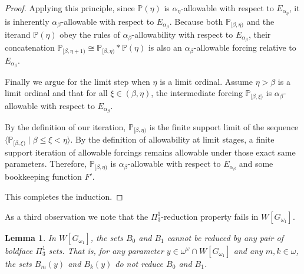 \documentclass[a4paper,11pt]{article}
\newtheorem{lemma}[theorem]{Lemma}
\begin{document}
\begin{proof}
Applying this principle, since $\mathbb{P}(\eta)$ is $\alpha_{\eta}$-allowable with respect to $E_{\alpha_{\eta}}$, it is inherently $\alpha_{\beta}$-allowable with respect to $E_{\alpha_{\beta}}$. Because both $\mathbb{P}_{[\beta,\eta)}$ and the iterand $\mathbb{P}(\eta)$ obey the rules of $\alpha_{\beta}$-allowability with respect to $E_{\alpha_{\beta}}$, their concatenation $\mathbb{P}_{[\beta,\eta+1)} \cong \mathbb{P}_{[\beta,\eta)} \ast \mathbb{P}(\eta)$ is also an $\alpha_{\beta}$-allowable forcing relative to $E_{\alpha_{\beta}}$.

Finally we argue for the limit step when $\eta$ is a limit ordinal.
Assume $\eta > \beta$ is a limit ordinal and that for all $\xi \in (\beta, \eta)$, the intermediate forcing $\mathbb{P}_{[\beta,\xi)}$ is $\alpha_{\beta}$-allowable with respect to $E_{\alpha_{\beta}}$. 

By the definition of our iteration, $\mathbb{P}_{[\beta,\eta)}$ is the finite support limit of the sequence $\langle \mathbb{P}_{[\beta,\xi)} \mid \beta \le \xi < \eta \rangle$. By the definition of allowability at limit stages, a finite support iteration of allowable forcings remains allowable under those exact same parameters. Therefore, $\mathbb{P}_{[\beta,\eta)}$ is $\alpha_{\beta}$-allowable with respect to $E_{\alpha_{\beta}}$ and some bookkeeping function $F'$. 

This completes the induction.
\end{proof}





As a third observation we note that the ${\Pi}^1_3$-reduction property fails in $W[G_{\omega_1}]$.


\begin{lemma}
In $W[G_{\omega_1}]$, the sets $B_0$ and $B_1$ cannot be reduced by any pair of boldface $\Pi_3^1$ sets. That is, for any parameter $y \in \omega^\omega \cap W[G_{\omega_1}]$ and any $m, k \in \omega$, the sets $B_m(y)$ and $B_k(y)$ do not reduce $B_0$ and $B_1$.
\end{lemma}
\end{document}

